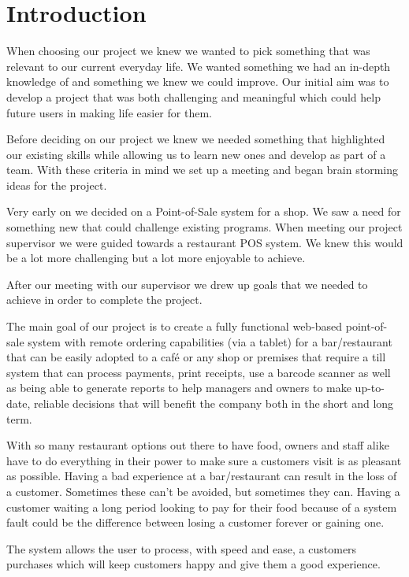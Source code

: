 \chapter{Introduction}
When choosing our project we knew we wanted to pick something that was relevant to our current everyday life. We wanted something we had an in-depth knowledge of and something we knew we could improve.  Our initial aim was to develop a project that was both challenging and meaningful which could help future users in making life easier for them.\par
Before deciding on our project we knew we needed something that highlighted our existing skills while allowing us to learn new ones and develop as part of a team. With these criteria in mind we set up a meeting and began brain storming ideas for the project.\par
Very early on we decided on a Point-of-Sale system for a shop. We saw a need for something new that could challenge existing programs. When meeting our project supervisor we were guided towards a restaurant POS system. We knew this would be a lot more challenging but a lot more enjoyable to achieve.\par
After our meeting with our supervisor we drew up goals that we needed to achieve in order to complete the project.\par
The main goal of our project is to create a fully functional web-based point-of-sale system with remote ordering capabilities (via a tablet) for a bar/restaurant that can be easily adopted to a café or any shop or premises that require a till system that can process payments, print receipts, use a barcode scanner as well as being able to generate reports to help managers and owners to make up-to-date, reliable decisions that will benefit the company both in the short and long term.\par
With so many restaurant options out there to have food, owners and staff alike have to do everything in their power to make sure a customers visit is as pleasant as possible. Having a bad experience at a bar/restaurant can result in the loss of a customer. Sometimes these can’t be avoided, but sometimes they can. Having a customer waiting a long period looking to pay for their food because of a system fault could be the difference between losing a customer forever or gaining one.\par
The system allows the user to process, with speed and ease, a customers purchases which will keep customers happy and give them a good experience.\par
